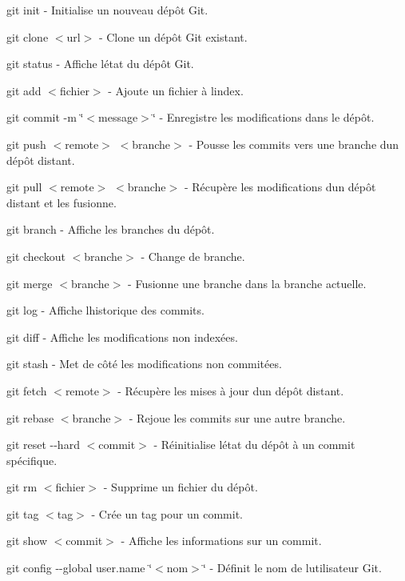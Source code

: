 
\begin{DoxyEnumerate}
\item {\ttfamily git init} -\/ Initialise un nouveau dépôt Git.
\item {\ttfamily git clone $<$url$>$} -\/ Clone un dépôt Git existant.
\item {\ttfamily git status} -\/ Affiche l\textquotesingle{}état du dépôt Git.
\item {\ttfamily git add $<$fichier$>$} -\/ Ajoute un fichier à l\textquotesingle{}index.
\item {\ttfamily git commit -\/m \char`\"{}$<$message$>$\char`\"{}} -\/ Enregistre les modifications dans le dépôt.
\item {\ttfamily git push $<$remote$>$ $<$branche$>$} -\/ Pousse les commits vers une branche d\textquotesingle{}un dépôt distant.
\item {\ttfamily git pull $<$remote$>$ $<$branche$>$} -\/ Récupère les modifications d\textquotesingle{}un dépôt distant et les fusionne.
\item {\ttfamily git branch} -\/ Affiche les branches du dépôt.
\item {\ttfamily git checkout $<$branche$>$} -\/ Change de branche.
\item {\ttfamily git merge $<$branche$>$} -\/ Fusionne une branche dans la branche actuelle.
\item {\ttfamily git log} -\/ Affiche l\textquotesingle{}historique des commits.
\item {\ttfamily git diff} -\/ Affiche les modifications non indexées.
\item {\ttfamily git stash} -\/ Met de côté les modifications non commitées.
\item {\ttfamily git fetch $<$remote$>$} -\/ Récupère les mises à jour d\textquotesingle{}un dépôt distant.
\item {\ttfamily git rebase $<$branche$>$} -\/ Rejoue les commits sur une autre branche.
\item {\ttfamily git reset -\/-\/hard $<$commit$>$} -\/ Réinitialise l\textquotesingle{}état du dépôt à un commit spécifique.
\item {\ttfamily git rm $<$fichier$>$} -\/ Supprime un fichier du dépôt.
\item {\ttfamily git tag $<$tag$>$} -\/ Crée un tag pour un commit.
\item {\ttfamily git show $<$commit$>$} -\/ Affiche les informations sur un commit.
\item {\ttfamily git config -\/-\/global user.\+name \char`\"{}$<$nom$>$\char`\"{}} -\/ Définit le nom de l\textquotesingle{}utilisateur Git.
\end{DoxyEnumerate}

